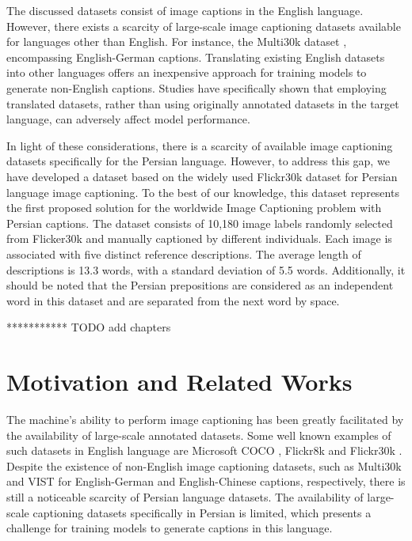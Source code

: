 \documentclass[runningheads]{llncs}
\begin{document}
The discussed datasets consist of image captions in the English language. However, there exists a scarcity of large-scale image captioning datasets available for languages other than English. For instance, the Multi30k dataset \cite{Multi30k}, encompassing English-German captions. Translating existing English datasets into other languages offers an inexpensive approach for training models to generate non-English captions. Studies \cite{Xue,Zoph,Rosa} have specifically shown that employing translated datasets, rather than using originally annotated datasets in the target language, can adversely affect model performance.

In light of these considerations, there is a scarcity of available image captioning datasets specifically for the Persian language. However, to address this gap, we have developed a dataset based on the widely used Flickr30k dataset \cite{Flickr30k} for Persian language image captioning. To the best of our knowledge, this dataset represents the first proposed solution for the worldwide Image Captioning problem with Persian captions. The dataset consists of 10,180 image labels randomly selected from Flicker30k and manually captioned by different individuals. Each image is associated with five distinct reference descriptions. The average length of descriptions is 13.3 words, with a standard deviation of 5.5 words. Additionally, it should be noted that the Persian prepositions are considered as an independent word in this dataset and are separated from the next word by space.

*********** TODO add chapters

\section{Motivation and Related Works}
The machine's ability to perform image captioning has been greatly facilitated by the availability of large-scale annotated datasets. Some well known examples of such datasets in English language are Microsoft COCO \cite{MSCOCO}, Flickr8k \cite{Flickr8k} and Flickr30k \cite{Flickr30k}. Despite the existence of non-English image captioning datasets, such as Multi30k \cite{Multi30k} and VIST \cite{VIST} for English-German and English-Chinese captions, respectively, there is still a noticeable scarcity of Persian language datasets. The availability of large-scale captioning datasets specifically in Persian is limited, which presents a challenge for training models to generate captions in this language.
\end{document}

